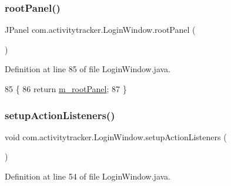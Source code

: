 \subsubsection{\texorpdfstring{root\+Panel()}{rootPanel()}}
{\footnotesize\ttfamily J\+Panel com.\+activitytracker.\+Login\+Window.\+root\+Panel (\begin{DoxyParamCaption}{ }\end{DoxyParamCaption})\hspace{0.3cm}{\ttfamily [package]}}



Definition at line 85 of file Login\+Window.\+java.


\begin{DoxyCode}
85                        \{
86         \textcolor{keywordflow}{return} \mbox{\hyperlink{classcom_1_1activitytracker_1_1_login_window_aa62049382baddb801cb25201814efc57}{m\_rootPanel}};
87     \}
\end{DoxyCode}
\mbox{\label{classcom_1_1activitytracker_1_1_login_window_af1ff236b841c51bfb49e143344a3c3ac}} 
\subsubsection{\texorpdfstring{setup\+Action\+Listeners()}{setupActionListeners()}}
{\footnotesize\ttfamily void com.\+activitytracker.\+Login\+Window.\+setup\+Action\+Listeners (\begin{DoxyParamCaption}{ }\end{DoxyParamCaption})\hspace{0.3cm}{\ttfamily [private]}}



Definition at line 54 of file Login\+Window.\+java.



